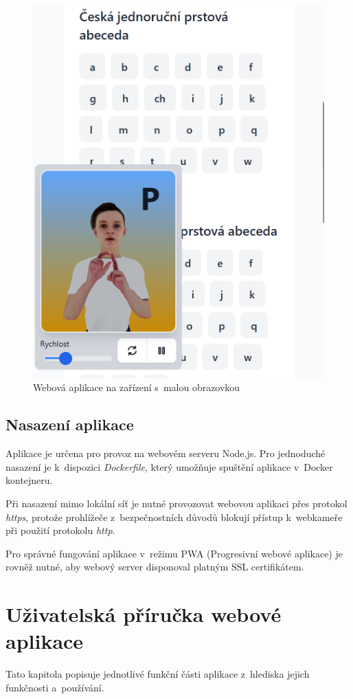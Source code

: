\documentclass[
  master,
  program=ainfvs,
  biblatex,
  figures=true,
  tables=false,
  sourcecodes=true,
  glossaries,
  index
]{kidiplom}
\begin{document}


        \begin{figure}[H]
            \centering
            \includegraphics[width=0.5\columnwidth]{graphics/mobile.png}
            \caption{Webová aplikace na zařízení s~malou obrazovkou}
            \label{mobile}
        \end{figure}
        
        
    \subsection{Nasazení aplikace}
        Aplikace je určena pro provoz na webovém serveru Node.js. Pro jednoduché nasazení je k~dispozici \emph{Dockerfile}, který umožňuje spuštění aplikace v~Docker kontejneru.
        
        Při nasazení mimo lokální síť je nutné provozovat webovou aplikaci přes protokol \emph{https}, protože prohlížeče z~bezpečnostních důvodů blokují přístup k~webkameře při použití protokolu \emph{http}.
        
        Pro správné fungování aplikace v~režimu PWA (Progresivní webové aplikace) je rovněž nutné, aby webový server disponoval platným SSL certifikátem.

\clearpage


\section{Uživatelská příručka webové aplikace}
    Tato kapitola popisuje jednotlivé funkční části aplikace z~hlediska jejich funkčnosti a~používání.
        
\end{document}
